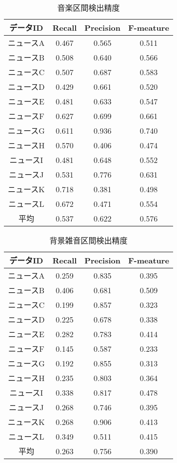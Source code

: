 \begin{table}[H]
  \begin{center}
    \caption{音楽区間検出精度 \label{table:NHK_music_RPF}}
    \begin{tabular}{|c||c|c|c|} \hline
データID & Recall & Precision & F-meature \\ \hline
ニュースA & 0.467 & 0.565 & 0.511 \\ \hline
ニュースB & 0.508 & 0.640 & 0.566 \\ \hline
ニュースC & 0.507 & 0.687 & 0.583 \\ \hline
ニュースD & 0.429 & 0.661 & 0.520 \\ \hline
ニュースE & 0.481 & 0.633 & 0.547 \\ \hline
ニュースF & 0.627 & 0.699 & 0.661 \\ \hline
ニュースG & 0.611 & 0.936 & 0.740 \\ \hline
ニュースH & 0.570 & 0.406 & 0.474 \\ \hline
ニュースI & 0.481 & 0.648 & 0.552 \\ \hline
ニュースJ & 0.531 & 0.776 & 0.631 \\ \hline
ニュースK & 0.718 & 0.381 & 0.498 \\ \hline
ニュースL & 0.672 & 0.471 & 0.554 \\ \hline
 平均 & 0.537 & 0.622 & 0.576 \\ \hline
    \end{tabular}
  \end{center}
\end{table}

\begin{table}[H]
  \begin{center}
    \caption{背景雑音区間検出精度 \label{table:NHK_noise_RPF}}
    \begin{tabular}{|c||c|c|c|} \hline
データID & Recall & Precision & F-meature \\ \hline
ニュースA & 0.259 & 0.835 & 0.395 \\ \hline
ニュースB & 0.406 & 0.681 & 0.509 \\ \hline
ニュースC & 0.199 & 0.857 & 0.323 \\ \hline
ニュースD & 0.225 & 0.678 & 0.338 \\ \hline
ニュースE & 0.282 & 0.783 & 0.414 \\ \hline
ニュースF & 0.145 & 0.587 & 0.233 \\ \hline
ニュースG & 0.192 & 0.855 & 0.313 \\ \hline
ニュースH & 0.235 & 0.803 & 0.364 \\ \hline
ニュースI & 0.338 & 0.817 & 0.478 \\ \hline
ニュースJ & 0.268 & 0.746 & 0.395 \\ \hline
ニュースK & 0.268 & 0.906 & 0.413 \\ \hline
ニュースL & 0.349 & 0.511 & 0.415 \\ \hline
 平均 & 0.263 & 0.756 & 0.390 \\ \hline
    \end{tabular}
  \end{center}
\end{table}

